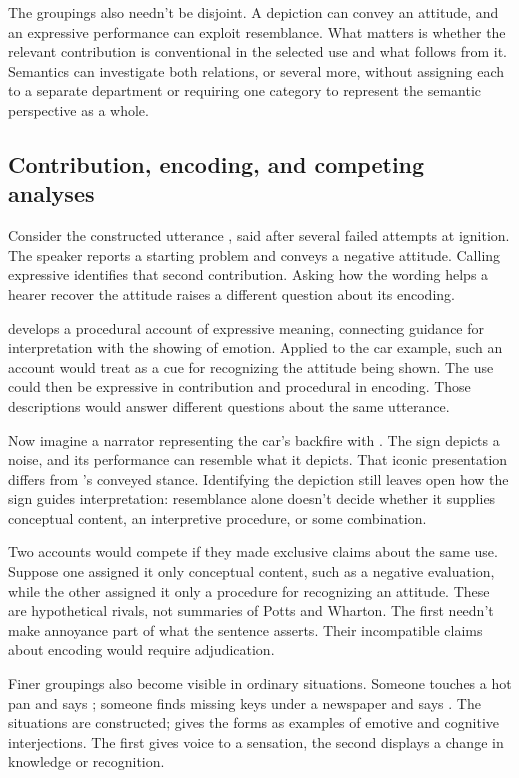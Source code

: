 \documentclass[12pt]{article}
\begin{document}
The groupings also needn't be disjoint. A depiction can convey an attitude,
and an expressive performance can exploit resemblance. What matters is
whether the relevant contribution is conventional in the selected use and
what follows from it. Semantics can investigate both relations, or several
more, without assigning each to a separate department or requiring one
category to represent the semantic perspective as a whole.

\subsection{Contribution, encoding, and competing analyses}\label{sec:encoding}

Consider the constructed utterance ,
said after several failed attempts at ignition. The speaker reports a
starting problem and conveys a negative attitude. Calling 
expressive identifies that second contribution. Asking how the wording
helps a hearer recover the attitude raises a different question about
its encoding.

\textcite{wharton2016expressives} develops a procedural account of expressive
meaning, connecting guidance for interpretation with the showing of emotion.
Applied to the car example, such an account would treat 
as a cue for recognizing the attitude being shown. The use could then
be expressive in contribution and procedural in encoding. Those descriptions
would answer different questions about the same utterance.

Now imagine a narrator representing the car's backfire with .
The sign depicts a noise, and its performance can resemble what it
depicts. That iconic presentation differs from 's conveyed
stance. Identifying the depiction still leaves open how the sign guides
interpretation: resemblance alone doesn't decide whether it supplies
conceptual content, an interpretive procedure, or some combination.

Two accounts would compete if they made exclusive claims
about the same  use. Suppose one assigned it only
conceptual content, such as a negative evaluation, while the other
assigned it only a procedure for recognizing an attitude. These are
hypothetical rivals, not summaries of Potts and Wharton. The first
needn't make annoyance part of what the sentence asserts. Their
incompatible claims about encoding would require adjudication.

Finer groupings also become visible in ordinary situations. Someone
touches a hot pan and says ; someone finds missing keys
under a newspaper and says . The situations are constructed;
\textcite[113]{ameka1992} gives the forms as examples of emotive and
cognitive interjections. The first gives voice to a sensation, the
second displays a change in knowledge or recognition.
\end{document}
